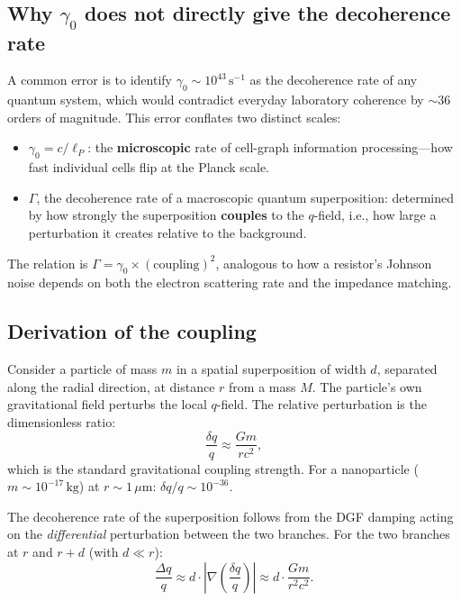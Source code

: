 \documentclass[aps,prl,twocolumn,showpacs,superscriptaddress,preprintnumbers]{revtex4-2}
\begin{document}
\subsection{Why $\gamma_0$ does not directly give the decoherence rate}

A common error is to identify $\gamma_0\sim10^{43}\,\mathrm{s}^{-1}$ as the decoherence rate of any quantum system, which would contradict everyday laboratory coherence by $\sim36$ orders of magnitude.
This error conflates two distinct scales:

\begin{itemize}
    \item $\gamma_0 = c/\ell_P$: the \textbf{microscopic} rate of cell-graph information processing---how fast individual cells flip at the Planck scale.
    \item $\Gamma$, the decoherence rate of a macroscopic quantum superposition: determined by how strongly the superposition \textbf{couples} to the $q$-field, i.e., how large a perturbation it creates relative to the background.
\end{itemize}

The relation is $\Gamma = \gamma_0 \times (\text{coupling})^2$, analogous to how a resistor's Johnson noise depends on both the electron scattering rate and the impedance matching.

\subsection{Derivation of the coupling}

Consider a particle of mass $m$ in a spatial superposition of width $d$, separated along the radial direction, at distance $r$ from a mass $M$.
The particle's own gravitational field perturbs the local $q$-field.
The relative perturbation is the dimensionless ratio:
\begin{equation}
\frac{\delta q}{q} \approx \frac{Gm}{rc^2},
\label{eq:coupling}
\end{equation}
which is the standard gravitational coupling strength.
For a nanoparticle ($m\sim10^{-17}\,\mathrm{kg}$) at $r\sim1\,\mu\mathrm{m}$: $\delta q/q\sim10^{-36}$.

The decoherence rate of the superposition follows from the DGF damping acting on the \emph{differential} perturbation between the two branches.
For the two branches at $r$ and $r+d$ (with $d\ll r$):
\begin{equation}
\frac{\Delta q}{q} \approx d \cdot \left|\nabla\left(\frac{\delta q}{q}\right)\right|
\approx d \cdot \frac{Gm}{r^2 c^2}.
\label{eq:differential}
\end{equation}
\end{document}
